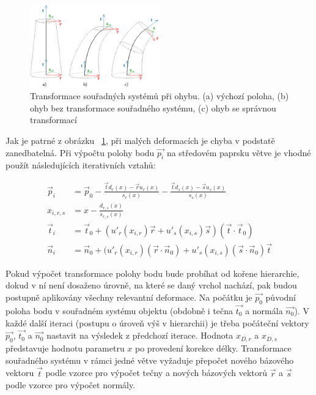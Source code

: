 	 
\begin{figure}[!hbt]
\begin{center}
\includegraphics[width=0.5\textwidth]{./figures/branchBend.png}
\end{center}
\caption[Transformace souřadných systémů při ohybu]%
{Transformace souřadných systémů při ohybu.
(a) výchozí poloha, (b) ohyb bez transformace souřadného systému, (c) ohyb se správnou transformací
\label{fig:bendCoordSys}
}
\end{figure}

Jak je patrné z obrázku ~\ref{fig:bendCoordSys}, při malých deformacích je chyba v podstatě zanedbatelná. Při výpočtu polohy bodu $\vec{p_i}$ na středovém paprsku větve je vhodné použít následujících iterativních vztahů:

\begin{align} 
\vec{p}_{i} &= \vec{p}_{0} - \frac{\vec{t}d_{r}(x)-\vec{r}u_{r}(x)}{s_{r}(x)}-\frac{\vec{t}d_{s}(x)-\vec{s}u_{s}(x)}{s_{s}(x)}\nonumber\\
x_{i,r,s} &= x - \frac{d_{r,s}(x)}{s_{r,s}(x)}\nonumber\\
\vec{t}_{i} &=  \vec{t}_{0} + (u'_{r}(x_{i,r})\vec{r} + u'_{s}(x_{i,s})\vec{s})(\vec{t}\cdot\vec{t}_{0})\\
\vec{n}_{i} &=  \vec{n}_{0} + (u'_{r}(x_{i,r})(\vec{r} \cdot \vec{n}_{0}) + u'_{s}(x_{i,s})(\vec{s} \cdot \vec{n}_{0})\vec{t}
\end{align}

Pokud výpočet transformace polohy bodu bude probíhat od kořene hierarchie, dokud v ní není dosaženo úrovně, na které se daný vrchol nachází, pak budou postupně aplikovány všechny relevantní deformace. Na počátku je $\vec{p_0}$ původní poloha bodu v souřadném systému objektu (obdobně i tečna $\vec{t_0}$  a normála $\vec{n_0}$). V každé další iteraci (postupu o úroveň výš v hierarchii) je třeba počáteční vektory $\vec{p_0}$, $\vec{t_0}$ a $\vec{n_0}$ nastavit na výsledek z předchozí iterace. Hodnota $x_{D,r}$ a $x_{D,s}$ představuje hodnotu parametru $x$ po provedení korekce délky.  Transformace souřadného systému v rámci jedné větve vyžaduje přepočet nového bázového vektoru $\vec{t}$ podle vzorce pro výpočet tečny a nových bázových vektorů $\vec{r}$ a $\vec{s}$ podle vzorce pro výpočet normály. 

